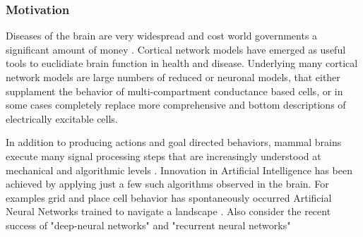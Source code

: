 

\subsubsection{Motivation}
Diseases of the brain are very widespread and cost world governments a significant amount of money \cite{who}. Cortical network models have emerged as useful tools to euclidiate brain function in health and disease. Underlying many cortical network models are large numbers of reduced or neuronal models, that either supplament the behavior of multi-compartment conductance based cells, or in some cases completely replace more comprehensive and bottom descriptions of electrically excitable cells.


In addition to producing actions and goal directed behaviors, mammal brains execute many signal processing steps that are increasingly understood at mechanical and algorithmic levels \cite{marr1976understanding}. Innovation in Artificial Intelligence has been achieved by applying just a few such algorithms observed in the brain. For examples grid and place cell behavior has spontaneously occurred Artificial Neural Networks trained to navigate a landscape \cite{banino2018vector}. Also consider the recent success of "deep-neural networks" and "recurrent neural networks"

